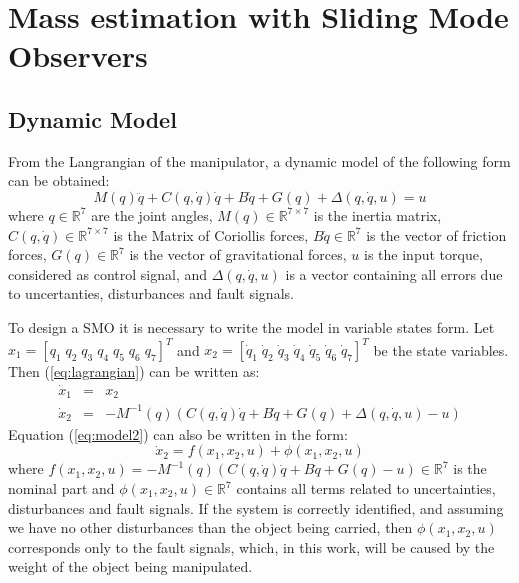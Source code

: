 \documentclass[a4paper, 10pt]{article}
\begin{document}
\section{Mass estimation with Sliding Mode Observers}
\label{sec:estimation}

\subsection{Dynamic Model}
  From the Langrangian of the manipulator, a dynamic model of the following form can be obtained:
  \begin{equation}
    M(q)\ddot{q} + C(q, \dot{q})\dot{q} + B\dot{q} + G(q) + \Delta(q,\dot{q}, u) = u
    \label{eq:lagrangian}
  \end{equation}
  where $q\in \mathbb{R}^7$ are the joint angles, $M(q)\in \mathbb{R}^{7\times 7}$ is the inertia matrix, $C(q,\dot{q})\in \mathbb{R}^{7\times 7}$ is the Matrix of Coriollis forces, $B\dot{q}\in \mathbb{R}^7$ is the vector of friction forces, $G(q)\in\mathbb{R}^7$ is the vector of gravitational forces, $u$ is the input torque, considered as control signal, and $\Delta(q,\dot{q},u)$ is a vector containing all errors due to uncertanties, disturbances and fault signals.
  
  To design a SMO it is necessary to write the model in variable states form. Let $x_1 = [q_1\;q_2\;q_3\;q_4\;q_5\;q_6\;q_7]^T$ and $x_2 = [\dot{q}_1\;\dot{q}_2\;\dot{q}_3\;\dot{q}_4\;\dot{q}_5\;\dot{q}_6\;\dot{q}_7]^T$ be the state variables. Then (\ref{eq:lagrangian}) can be written as:
  \begin{eqnarray}
    \dot{x}_1 &=& x_2\label{eq:model1}\\
    \dot{x}_2 &=& -M^{-1}(q)\left(C(q, \dot{q})\dot{q} + B\dot{q} + G(q) + \Delta(q,\dot{q},u) - u\right)\label{eq:model2}
  \end{eqnarray}
Equation (\ref{eq:model2}) can also be written in the form:
  \begin{equation*}
    \dot{x}_2 = f(x_1, x_2, u) + \phi(x_1, x_2, u)
  \end{equation*}
  where $f(x_1, x_2, u) = -M^{-1}(q)\left(C(q, \dot{q})\dot{q} + B\dot{q} + G(q) - u\right) \in \mathbb{R}^7$ is the nominal part and $\phi(x_1, x_2, u) \in \mathbb{R}^7$ contains all terms related to uncertainties, disturbances and fault signals. If the system is correctly identified, and assuming we have no other disturbances than the object being carried, then $\phi(x_1, x_2, u)$ corresponds only to the fault signals, which, in this work, will be caused by the weight of the object being manipulated.
\end{document}
